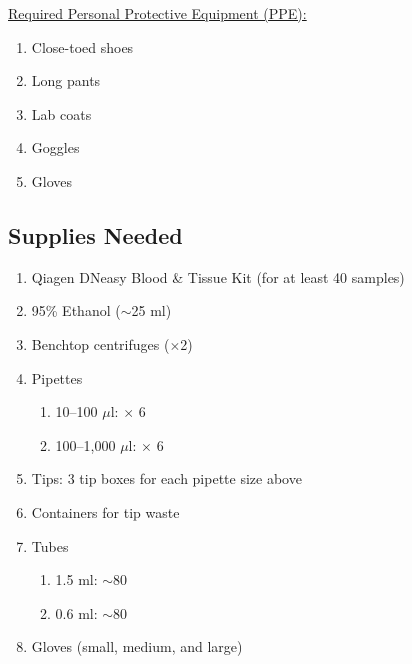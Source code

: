 \documentclass[12pt, hidelinks]{article}
\begin{document}
	\underline{Required Personal Protective Equipment (PPE):}
		\begin{enumerate}
			\item Close-toed shoes
			\item Long pants
			\item Lab coats
			\item Goggles
			\item Gloves
		\end{enumerate}
	
	
	\subsection{Supplies Needed}
		\begin{enumerate}
			\item Qiagen DNeasy Blood \& Tissue Kit (for at least 40 samples)
			\item 95\% Ethanol ($\sim$25 ml)
			\item Benchtop centrifuges ($\times$2)
			\item Pipettes
				\begin{enumerate}
					\item 10--100 $\mu$l: $\times$ 6
					\item 100--1,000 $\mu$l: $\times$ 6
				\end{enumerate}
			\item Tips: 3 tip boxes for each pipette size above
			\item Containers for tip waste
			\item Tubes
				\begin{enumerate}
					\item 1.5 ml: $\sim$80
					\item 0.6 ml: $\sim$80
				\end{enumerate}	
			\item Gloves (small, medium, and large)	
		\end{enumerate}
	
	
\end{document}
